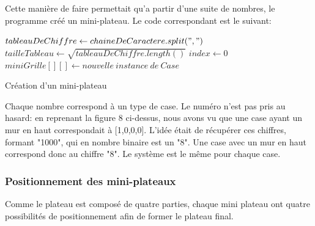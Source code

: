\documentclass[a4paper, 12pt]{article}
\begin{document}
            
            Cette manière de faire permettait qu'a partir d'une suite de nombres, le programme créé un mini-plateau. Le code correspondant est le suivant:
                
            \begin{algorithm}[H]%
                \DontPrintSemicolon
                $tableauDeChiffre \gets chaineDeCaractere.split(",")$
                $tailleTableau \gets \sqrt{tableauDeChiffre.length()}$
                $index \gets 0$
                $miniGrille[][] \gets {nouvelle \ instance \ de \ Case }$
                \;
                \caption{\sc Création d'un mini-plateau}
            \end{algorithm}%
            
            Chaque nombre correspond à un type de case. Le numéro n'est pas pris au hasard: en reprenant la figure 8 ci-dessus, nous avons vu que une case ayant un mur en haut correspondait à [1,0,0,0]. L'idée était de récupérer ces chiffres, formant "1000", qui en nombre binaire est un "8". Une case avec un mur en haut correspond donc au chiffre "8". Le système est le même pour chaque case.
            
            \subsubsection{Positionnement des mini-plateaux}
    
            Comme le plateau est composé de quatre parties, chaque mini plateau ont quatre possibilités de positionnement afin de former le plateau final.
        
            \begin{center}
            \end{center}
            
\end{document}
